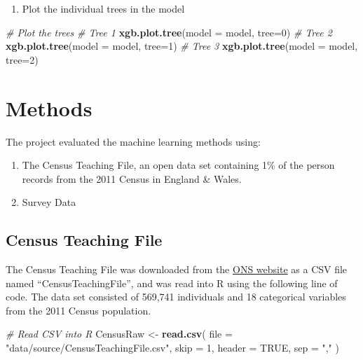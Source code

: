 \documentclass[]{book}
\newenvironment{Shaded}{\begin{snugshade}}{\end{snugshade}}
\newcommand{\KeywordTok}[1]{\textcolor[rgb]{0.13,0.29,0.53}{\textbf{#1}}}
\newcommand{\DataTypeTok}[1]{\textcolor[rgb]{0.13,0.29,0.53}{#1}}
\newcommand{\DecValTok}[1]{\textcolor[rgb]{0.00,0.00,0.81}{#1}}
\newcommand{\StringTok}[1]{\textcolor[rgb]{0.31,0.60,0.02}{#1}}
\newcommand{\CommentTok}[1]{\textcolor[rgb]{0.56,0.35,0.01}{\textit{#1}}}
\newcommand{\OtherTok}[1]{\textcolor[rgb]{0.56,0.35,0.01}{#1}}
\newcommand{\NormalTok}[1]{#1}
\providecommand{\tightlist}{%
  \setlength{\itemsep}{0pt}\setlength{\parskip}{0pt}}
\begin{document}
\begin{enumerate}
\def\labelenumi{\arabic{enumi})}
\setcounter{enumi}{7}
\tightlist
\item
  Plot the individual trees in the model
\end{enumerate}

\begin{Shaded}
\begin{Highlighting}[]
\CommentTok{# Plot the trees}
\CommentTok{# Tree 1}
\KeywordTok{xgb.plot.tree}\NormalTok{(}\DataTypeTok{model =}\NormalTok{ model, }\DataTypeTok{tree=}\DecValTok{0}\NormalTok{)}
\CommentTok{# Tree 2}
\KeywordTok{xgb.plot.tree}\NormalTok{(}\DataTypeTok{model =}\NormalTok{ model, }\DataTypeTok{tree=}\DecValTok{1}\NormalTok{)}
\CommentTok{# Tree 3}
\KeywordTok{xgb.plot.tree}\NormalTok{(}\DataTypeTok{model =}\NormalTok{ model, }\DataTypeTok{tree=}\DecValTok{2}\NormalTok{)}
\end{Highlighting}
\end{Shaded}

\chapter{Methods}\label{methods-1}

The project evaluated the machine learning methods using:

\begin{enumerate}
\def\labelenumi{\arabic{enumi})}
\tightlist
\item
  The Census Teaching File, an open data set containing 1\% of the
  person records from the 2011 Census in England \& Wales.\\
\item
  Survey Data
\end{enumerate}

\section{Census Teaching File}\label{census-teaching-file}

The Census Teaching File was downloaded from the
\href{https://www.ons.gov.uk/census/2011census/2011censusdata/censusmicrodata/microdatateachingfile}{ONS
website} as a CSV file named ``CensusTeachingFile'', and was read into R
using the following line of code. The data set consisted of 569,741
individuals and 18 categorical variables from the 2011 Census
population.

\begin{Shaded}
\begin{Highlighting}[]
\CommentTok{# Read CSV into R}
\NormalTok{CensusRaw <-}\StringTok{ }\KeywordTok{read.csv}\NormalTok{(}
  \DataTypeTok{file =} \StringTok{"data/source/CensusTeachingFile.csv"}\NormalTok{, }\DataTypeTok{skip =} \DecValTok{1}\NormalTok{,}
  \DataTypeTok{header =} \OtherTok{TRUE}\NormalTok{, }\DataTypeTok{sep =} \StringTok{","}
\NormalTok{)}
\end{Highlighting}
\end{Shaded}
\end{document}
